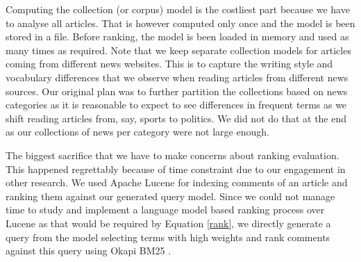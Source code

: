 \documentclass[article]{IEEEtran}
\begin{document}
Computing the collection (or corpus) model is the costliest part because we have to analyse all articles. That is however computed only once and the model is been stored in a file. Before ranking, the model is been loaded in memory and used as many times as required. Note that we keep separate collection models for articles coming from different news websites. This is to capture the writing style and vocabulary differences that we observe when reading articles from different news sources. Our original plan was to further partition the collections based on news categories as it is reasonable to expect to see differences in frequent terms as we shift reading articles from, say, sports to politics. We did not do that at the end as our collections of news per category were not large enough.     

The biggest sacrifice that we have to make concerns about ranking evaluation. This happened regrettably because of time constraint due to our engagement in other research. We used Apache Lucene \cite{McCandless:2010:LAS:1893016} for indexing comments of an article and ranking them against our generated query model. Since we could not manage time to study and implement a language model based ranking process over Lucene as that would be required by Equation \ref{rank}, we directly generate a query from the model selecting terms with high weights and 
rank comments against this query using Okapi BM25 \cite{Robertson96okapiat}.
\end{document}
